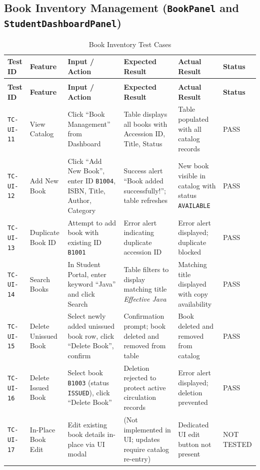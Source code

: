 \subsection{Book Inventory Management (\texttt{BookPanel} and \texttt{StudentDashboardPanel})}
{\footnotesize
\setlength{\tabcolsep}{3pt}
\begin{longtable}{>{\raggedright\arraybackslash}p{1.6cm} >{\raggedright\arraybackslash}p{2.1cm} >{\raggedright\arraybackslash}p{2.5cm} >{\raggedright\arraybackslash}p{3.1cm} >{\raggedright\arraybackslash}p{3.1cm} >{\centering\arraybackslash}p{1.4cm}}
\caption{Book Inventory Test Cases} \label{tab:test_ui_books} \\
\toprule
\textbf{Test ID} & \textbf{Feature} & \textbf{Input / Action} & \textbf{Expected Result} & \textbf{Actual Result} & \textbf{Status} \\
\midrule
\endfirsthead
\multicolumn{6}{c}{{\bfseries Table \thetable\ continued from previous page}} \\
\toprule
\textbf{Test ID} & \textbf{Feature} & \textbf{Input / Action} & \textbf{Expected Result} & \textbf{Actual Result} & \textbf{Status} \\
\midrule
\endhead
\bottomrule
\endfoot
\texttt{TC-UI-11} & View Catalog & Click ``Book Management'' from Dashboard & Table displays all books with Accession ID, Title, Status & Table populated with all catalog records & PASS \\
\midrule
\texttt{TC-UI-12} & Add New Book & Click ``Add New Book'', enter ID \texttt{B1004}, ISBN, Title, Author, Category & Success alert ``Book added successfully!''; table refreshes & New book visible in catalog with status \texttt{AVAILABLE} & PASS \\
\midrule
\texttt{TC-UI-13} & Duplicate Book ID & Attempt to add book with existing ID \texttt{B1001} & Error alert indicating duplicate accession ID & Error alert displayed; duplicate blocked & PASS \\
\midrule
\texttt{TC-UI-14} & Search Books & In Student Portal, enter keyword ``Java'' and click Search & Table filters to display matching title \textit{Effective Java} & Matching title displayed with copy availability & PASS \\
\midrule
\texttt{TC-UI-15} & Delete Unissued Book & Select newly added unissued book row, click ``Delete Book'', confirm & Confirmation prompt; book deleted and removed from table & Book deleted and removed from catalog & PASS \\
\midrule
\texttt{TC-UI-16} & Delete Issued Book & Select book \texttt{B1003} (status \texttt{ISSUED}), click ``Delete Book'' & Deletion rejected to protect active circulation records & Error alert displayed; deletion prevented & PASS \\
\midrule
\texttt{TC-UI-17} & In-Place Book Edit & Edit existing book details in-place via UI modal & (Not implemented in UI; updates require catalog re-entry) & Dedicated UI edit button not present & NOT TESTED \\
\end{longtable}
}

